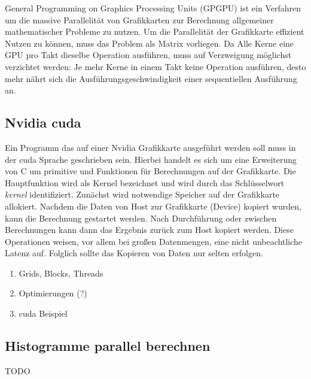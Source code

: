 General Programming on Graphics Processing Units (GPGPU) ist ein Verfahren um die massive Parallelität von Grafikkarten zur Berechnung allgemeiner mathematischer Probleme zu nutzen. Um die Parallelität der Grafikkarte effizient Nutzen zu können, muss das Problem als Matrix vorliegen. Da Alle Kerne eine GPU pro Takt dieselbe Operation ausführen, muss auf Verzweigung möglichst verzichtet werden: Je mehr Kerne  in einem Takt keine Operation ausführen, desto mehr nährt sich die Ausführungsgeschwindigkeit einer sequentiellen Ausführung an.

\subsection{Nvidia cuda}

Ein Programm das auf einer Nvidia Grafikkarte ausgeführt werden soll muss in der cuda Sprache geschrieben sein. Hierbei handelt es sich um eine Erweiterung von C um primitive und Funktionen für Berechnungen auf der Grafikkarte. Die Hauptfunktion wird als Kernel bezeichnet und wird durch das Schlüsselwort \textit{\textunderscore\textunderscore kernel\textunderscore\textunderscore} identifiziert. Zunächst wird notwendige Speicher auf der Grafikkarte allokiert. Nachdem die Daten von Host zur Grafikkarte (Device) kopiert wurden, kann die Berechnung gestartet werden. Nach Durchführung oder zwischen Berechnungen kann dann das Ergebnis zurück zum Host kopiert werden. Diese Operationen weisen, vor allem bei großen Datenmengen, eine nicht unbeachtliche Latenz auf. Folglich sollte das Kopieren von Daten nur selten erfolgen.

\begin{enumerate}
	\item Grids, Blocks, Threads
	\item Optimierungen (?)
	\item cuda Beispiel
\end{enumerate}

\subsection{Histogramme parallel berechnen}

TODO